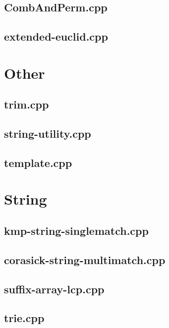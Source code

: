 \documentclass[10pt,twocolumn,landscape]{article}
\begin{document}
\subsection{CombAndPerm.cpp}


\subsection{extended-euclid.cpp}


\section{Other}

\subsection{trim.cpp}


\subsection{string-utility.cpp}


\subsection{template.cpp}


\section{String}

\subsection{kmp-string-singlematch.cpp}


\subsection{corasick-string-multimatch.cpp}


\subsection{suffix-array-lcp.cpp}


\subsection{trie.cpp}

\end{document}
